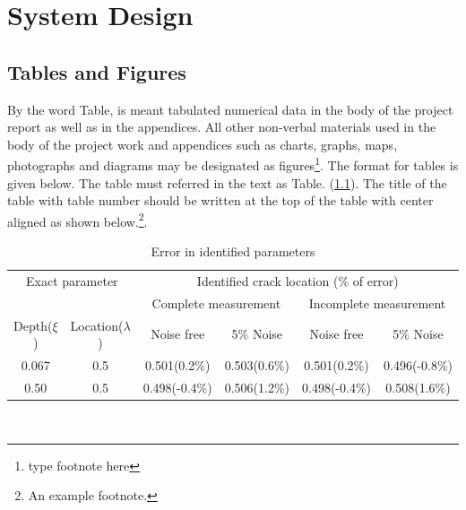 \documentclass[BTech]{srmuthesis}
\begin{document}
\chapter{System Design}
\section{Tables and Figures} 
 By the word Table, is meant tabulated numerical data in the body of the project report as well as in the appendices. All other non-verbal materials used in the body of the project work and appendices such as charts, graphs, maps, photographs and diagrams may be designated as figures\footnote{type footnote here}.
  The format for tables  is given below. The table must referred in the text as Table. (\ref{tab:frmcl}). The title of the table with table number should be written at the top of the table with center aligned as shown below.\footnote{An example footnote.}.
 \begin{table}[htpb]
      \centering
      \caption{Error in identified parameters}
      \begin{tabular}{|c|c|c|c|c|c|}
      	\hline
      	\multicolumn{2}{|c|}{Exact parameter} &               \multicolumn{4}{c|}{Identified crack location (\% of error)}               \\ \cline{3-6}
      	\multicolumn{2}{|c|}{}                & \multicolumn{2}{c|}{Complete measurement} & \multicolumn{2}{|c|}{Incomplete measurement} \\ \hline
      	Depth($\xi$) &  Location($\lambda$)   &  Noise free   &         5\% Noise         &  Noise free   &          5\% Noise           \\ \hline
      	   0.067     &          0.5           & 0.501(0.2\%)  &       0.503(0.6\%)        & 0.501(0.2\%)  &        0.496(-0.8\%)         \\
      	    0.50     &          0.5           & 0.498(-0.4\%) &       0.506(1.2\%)        & 0.498(-0.4\%) &         0.508(1.6\%)         \\ \hline
      \end{tabular}
        \label{tab:frmcl}
      \end{table}\\
      
\end{document}
